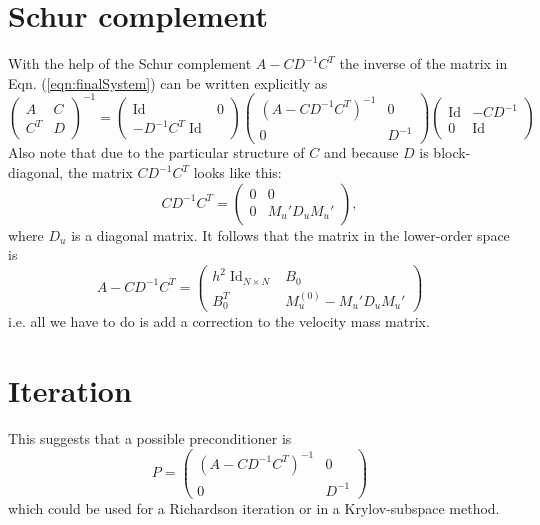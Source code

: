 \documentclass[12pt]{article}
\newcommand{\Id}{\operatorname{Id}}
\begin{document}
\section{Schur complement}
With the help of the Schur complement $A-CD^{-1}C^T$ the inverse of the matrix in Eqn. (\ref{eqn:finalSystem}) can be written explicitly as
\begin{equation}
  \begin{pmatrix}
A & C \\
C^T & D  
\end{pmatrix}^{-1}
=
\begin{pmatrix}
  \Id & 0 \\ -D^{-1}C^T \Id 
\end{pmatrix}
\begin{pmatrix}
\left(A-CD^{-1}C^T\right)^{-1}  & 0 \\
0 & D^{-1}  
\end{pmatrix}
\begin{pmatrix}
\Id & -CD^{-1}\\ 0 & \Id 
\end{pmatrix}
\end{equation}
Also note that due to the particular structure of $C$ and because $D$ is block-diagonal, the matrix $CD^{-1}C^T$ looks like this:
\begin{equation}
CD^{-1}C^T =
\begin{pmatrix}
  0 & 0 \\
  0 & M_u' D_u M_u'
\end{pmatrix},
\end{equation}
where $D_u$ is a diagonal matrix. It follows that the matrix in the lower-order space is
\begin{equation}
A-CD^{-1}C^T
=
\begin{pmatrix}
h^2\Id_{N\times N} & B_0  \\
  B_0^T & M_u^{(0)} - M_u' D_u M_u'
\end{pmatrix}
\end{equation}
i.e. all we have to do is add a correction to the velocity mass matrix.
\section{Iteration}
This suggests that a possible preconditioner is
\begin{equation}
P=
\begin{pmatrix}
\left(A-CD^{-1}C^T\right)^{-1}  & 0 \\
0 & D^{-1}  
\end{pmatrix}
\end{equation}
which could be used for a Richardson iteration or in a Krylov-subspace method.
\end{document}
